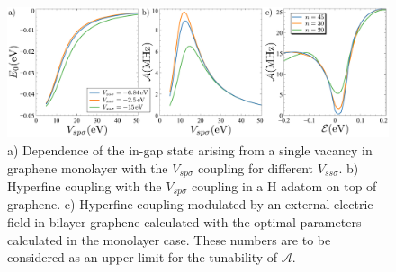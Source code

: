 \begin{figure}[h!]
\centering
\includegraphics{defects/fig/coupling_hyper.pdf}
\vspace{-10pt}
\caption{a) Dependence of the in-gap state arising from a single vacancy in graphene monolayer with the $V_{sp\sigma}$ coupling for different $V_{ss\sigma}$. b) Hyperfine coupling with the $V_{sp\sigma}$ coupling in a H adatom on top of graphene. c) Hyperfine coupling modulated by an external electric field in bilayer graphene calculated with the optimal parameters calculated in the monolayer case. These numbers are to be considered as an upper limit for the tunability of $\mathcal{A}$.}
\label{hyperfine}
\end{figure}
\FloatBarrier

